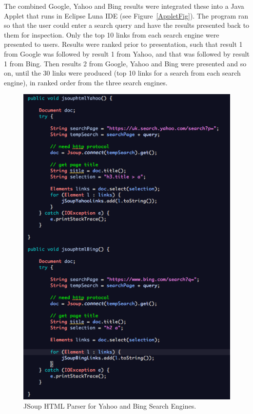 \documentclass[a4paper, 11pt]{article}
\begin{document}
\vspace{5mm}
The combined Google, Yahoo and Bing results were integrated these into a Java Applet that runs in Eclipse Luna IDE (see Figure~\ref{AppletFig}). The program ran so that the user could enter a search query and have the results presented back to them for inspection. Only the top 10 links from each search engine were presented to users. Results were ranked prior to presentation, such that result 1 from Google was followed by result 1 from Yahoo, and that was followed by result 1 from Bing. Then results 2 from Google, Yahoo and Bing were presented and so on, until the 30 links were produced (top 10 links for a search from each search engine), in ranked order from the three search engines. 

\begin{figure}[H]
\begin{center}
\includegraphics[scale=0.60]{htmlParsers}
\end{center}
\caption{JSoup HTML Parser for Yahoo and Bing Search Engines.}
\label{GoogleSignInPage}
\end{figure}
\end{document}
